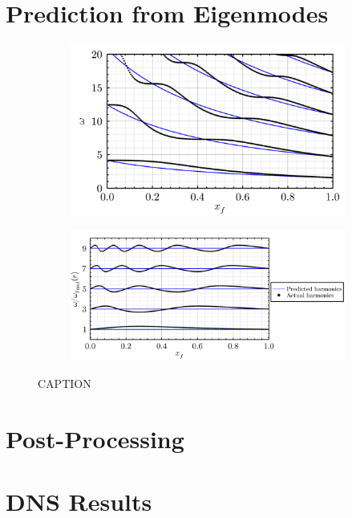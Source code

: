 \section{Prediction from Eigenmodes}


\begin{figure}[t]
\centering
\begin{subfigure}{0.4\textwidth}
\centering
\includegraphics[scale=0.3]{assets/graphs/r=7_harmonics.pdf}
\caption{}
\label{fig:harm_1}
\end{subfigure}
\begin{subfigure}{0.4\textwidth}
\centering
\includegraphics[scale=0.3]{assets/graphs/r=7_harmonics_adjusted.pdf}
\caption{}
\label{fig:harm_2}
\end{subfigure}
\caption{CAPTION}
\label{fig:1}
\end{figure}
    
    


\section{Post-Processing}



\section{DNS Results}



